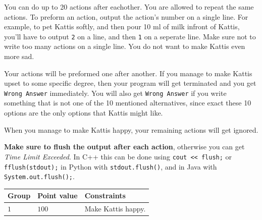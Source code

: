 You can do up to 20 actions after eachother. You are allowed to repeat the same actions.
To preform an action, output the action's number on a single line. For example, to pet Kattis softly, 
and then pour 10 ml of milk infront of Kattis, you'll have to output \texttt{2} on a line, and then \texttt{1} on a seperate line.
Make sure not to write too many actions on a single line. You do not want to make Kattis even more sad.

Your actions will be preformed one after another. If you manage to make Kattis upset to some specific degree,
then your program will get terminated and you get \texttt{Wrong Answer} immediately.
You will also get \texttt{Wrong Answer} if you write something that is not one of the 10 mentioned alternatives,
since exact these 10 options are the only options that Kattis might like.

When you manage to make Kattis happy, your remaining actions will get ignored.


\textbf{Make sure to flush the output after each action}, otherwise you can get \textit{Time Limit Exceeded}.
In C++ this can be done using \texttt{cout << flush;}
or \texttt{fflush(stdout);}
in Python with \texttt{stdout.flush()},
and in Java with \texttt{System.out.flush();}.


\noindent
\begin{tabular}{| l | l | l |}
  \hline
  \textbf{Group} & \textbf{Point value} & \textbf{Constraints} \\ \hline
  $1$   & $100$        & Make Kattis happy. \\ \hline
\end{tabular}
